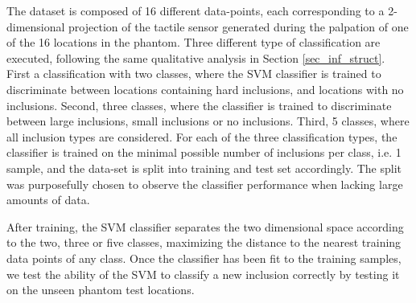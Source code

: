 The dataset is composed of 16 different data-points, each corresponding to a 2-dimensional projection of the tactile sensor generated during the palpation of one of the 16 locations in the phantom. Three different type of classification are executed, following the same qualitative analysis in Section \ref{sec_inf_struct}. First a classification with two classes, where the SVM classifier is trained to discriminate between locations containing hard inclusions, and locations with no inclusions. Second, three classes, where the classifier is trained to discriminate between large inclusions, small inclusions or no inclusions. Third, 5 classes, where all inclusion types are considered. For each of the three classification types, the classifier is trained on the minimal possible number of inclusions per class, i.e. 1 sample, and the data-set is split into training and test set accordingly. The split was purposefully chosen to observe the classifier performance when lacking large amounts of data.

After training, the SVM classifier separates the two dimensional space according to the two, three or five classes, maximizing the distance to the nearest training data points of any class. 
Once the classifier has been fit to the training samples, we test the ability of the SVM to classify a new inclusion correctly by testing it on the unseen phantom test locations. 

